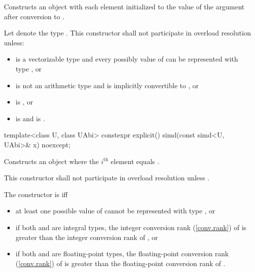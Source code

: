 \begin{itemdescr}
  \pnum\effects
  Constructs an object with each element initialized to the value of the argument after conversion to .

  \pnum\remarks
  Let  denote the type . This constructor shall not participate in overload resolution unless:
  \begin{itemize}
    \item {} is a vectorizable type and every possibly value of  can be represented with type , or
    \item {} is not an arithmetic type and is implicitly convertible to , or
    \item {} is , or
    \item {} is  and  is .%
  \end{itemize}

\end{itemdescr}

\begin{itemdecl}
template<class U, class UAbi> constexpr explicit(\seebelow) simd(const simd<U, UAbi>& x) noexcept;
\end{itemdecl}

\begin{itemdescr}
  \pnum\effects
  Constructs an object where the $i^\text{th}$ element equals  \foralli.

  \pnum\remarks
  This constructor shall not participate in overload resolution unless
  .

    \pnum
    The constructor is  iff
    \begin{itemize}
      \item at least one possible value of  cannot be represented with type , or
      \item if both  and  are integral types, the integer conversion rank (\mbox{\ref{conv.rank}}) of  is greater than the integer conversion rank of , or
      \item if both  and  are floating-point types, the floating-point conversion rank (\mbox{\ref{conv.rank}}) of  is greater than the floating-point conversion rank of .
    \end{itemize}
\end{itemdescr}

